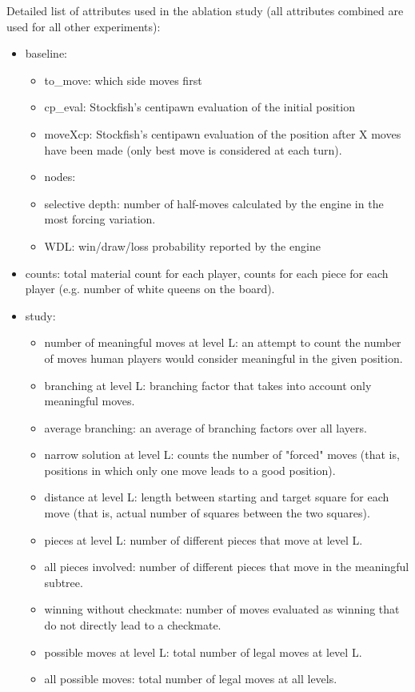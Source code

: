 \documentclass[sigconf,nonacm]{acmart}
\begin{document}
Detailed list of attributes used in the ablation study (all attributes combined are used for all other experiments):
\begin{itemize}
\item baseline: 
\begin{itemize}
\item to\_move: which side moves first
\item cp\_eval: Stockfish's centipawn evaluation of the initial position
\item moveXcp: Stockfish's centipawn evaluation of the position after X moves have been made (only best move is considered at each turn).
\item nodes:
\item selective depth: number of half-moves calculated by the engine in the most forcing variation.
\item WDL: win/draw/loss probability reported by the engine
\end{itemize}
\item counts: total material count for each player, counts for each piece for each player (e.g. number of white queens on the board). 
\item study:
\begin{itemize}
\item number of meaningful moves at level L: an attempt to count the number of moves human players would consider meaningful in the given position.
\item branching at level L: branching factor that takes into account only meaningful moves. 
\item average branching: an average of branching factors over all layers.
\item narrow solution at level L: counts the number of "forced" moves (that is, positions in which only one move leads to a good position). 
\item distance at level L: length between starting and target square for each move (that is, actual number of squares between the two squares).
\item pieces at level L: number of different pieces that move at level L.
\item all pieces involved: number of different pieces that move in the meaningful subtree. 
\item winning without checkmate: number of moves evaluated as winning that do not directly lead to a checkmate.
\item possible moves at level L: total number of legal moves at level L.
\item all possible moves: total number of legal moves at all levels.

\end{itemize}
\end{itemize}
\end{document}
